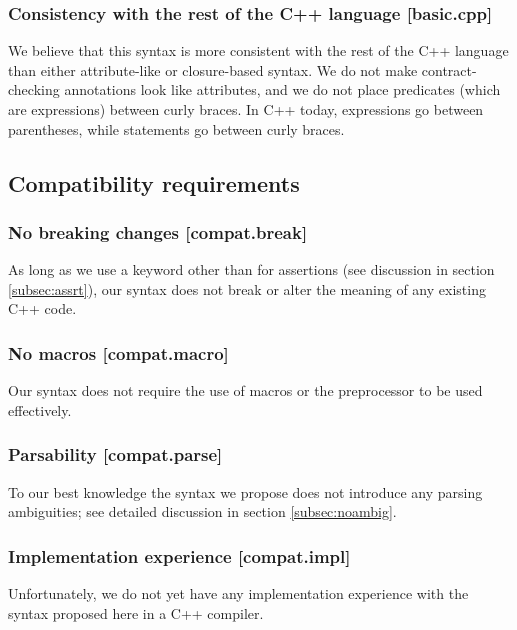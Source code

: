 \subsubsection{Consistency with the rest of the C++ language  [basic.cpp]}

We believe that this syntax is more consistent with the rest of the C++ language than either attribute-like or closure-based syntax. We do not make contract-checking annotations look like attributes, and we do not place predicates (which are expressions) between curly braces. In C++ today, expressions go between parentheses, while statements go between curly braces.

\subsection{Compatibility requirements}

\subsubsection{No breaking changes  [compat.break]}

As long as we use a keyword other than  for assertions (see discussion in section \ref{subsec:assrt}), our syntax does not break or alter the meaning of any existing C++ code.

\subsubsection{No macros  [compat.macro]}

Our syntax does not require the use of macros or the preprocessor to be used effectively.

\subsubsection{Parsability  [compat.parse]}

To our best knowledge the syntax we propose does not introduce any parsing ambiguities; see detailed discussion in section \ref{subsec:noambig}.

\subsubsection{Implementation experience  [compat.impl]}

Unfortunately, we do not yet have any implementation experience with the syntax proposed here in a C++ compiler.

